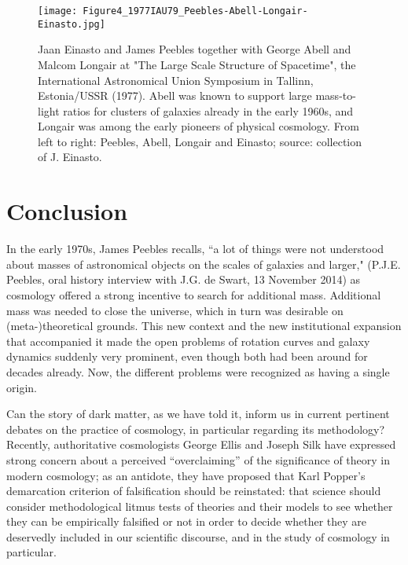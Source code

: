 \documentclass{naturefig}
\begin{document}
\begin{figure}[t]
\centering
	\texttt{[image: Figure4\_1977IAU79\_Peebles-Abell-Longair-Einasto.jpg]}
\caption{Jaan Einasto and James Peebles together with George Abell and Malcom Longair at "The Large Scale Structure of Spacetime", the International Astronomical Union Symposium in Tallinn, Estonia/USSR (1977). Abell was known to support large mass-to-light ratios for clusters of galaxies already in the early 1960s,\cite{Abell1961} and Longair was among the early pioneers of physical cosmology.\cite{Longair1971} From left to right: Peebles, Abell, Longair and Einasto; source:  collection of J. Einasto.}
\end{figure}

\vspace{8pt}


\section*{Conclusion}

In the early 1970s, James Peebles recalls, ``a lot of things were not understood about masses of astronomical objects on the scales of galaxies and larger," (P.J.E. Peebles, oral history interview with J.G. de Swart, 13 November 2014) as cosmology offered a strong incentive to search for additional mass.
Additional mass was needed to close the universe, which in turn was desirable on (meta-)theoretical grounds. %
This new context and the new institutional expansion that accompanied it made the open problems of rotation curves and galaxy dynamics suddenly very prominent, even though both had been around for decades already. Now, the different problems were recognized as having a single origin.



Can the story of dark matter, as we have told it, inform us in current pertinent debates on the practice of cosmology, in particular regarding its methodology? Recently, authoritative cosmologists George Ellis and Joseph Silk have expressed strong concern about a perceived ``overclaiming'' of the significance of theory in modern cosmology;\cite{Ellis2014} as an antidote, they have proposed that Karl Popper's demarcation criterion of falsification should be reinstated:\cite{Popper1963} that science should consider methodological litmus tests of theories and their models to see whether they can be empirically falsified or not in order to decide whether they are deservedly included in our scientific discourse, and in the study of cosmology in particular.
\end{document}

